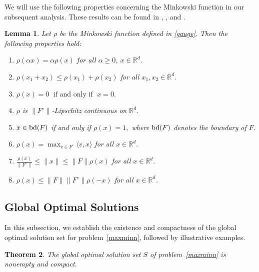 \documentclass[11pt]{article}
\newtheorem{theorem}{Theorem}[section]
\newtheorem{lemma}[theorem]{Lemma}
\theoremstyle{definition}
\newcommand{\R}{\mathbb{R}}
\newcommand{\1}{\mathbf{1}}
\begin{document}
We will use the following properties concerning the Minkowski function in our subsequent analysis. These results can be found in \cite[Proposition 2.1]{colombo2004subgradient},  \cite[Lemma 4.1]{longoptimletter}, and \cite[Theorem 6.14 and Proposition 6.18]{mordukhovich2023easy}.

\begin{lemma}\label{lemmarho0}
Let $\rho$ be the Minkowski function defined in \eqref{gauge}. Then the following properties hold:
	\begin{enumerate}
	\item [{\rm (a)}] $\rho(\alpha x) =\alpha\rho(x)$ for all $\alpha \geq0$,  $x\in \R^d$.
	\item [{\rm (b)}] $\rho(x_1+x_2)\leq \rho(x_1)+\rho(x_2)$ for all $x_1,x_2\in \R^d$.
	\item [{\rm (c)}] $\rho(x)=0\;\text{ if and only if }\; x=0.$
	\item [{\rm (d)}]  $\rho$ is $\|F^\circ\|$-Lipschitz continuous on $\R^d$.
	\item [{\rm (e)}] $x\in {\rm bd}(F)$ if and only if $\rho(x)=1,$ where ${\rm bd}(F)$ denotes the boundary of $F$.
	\item [{\rm (f)}] $\rho(x)=\max_{v\in F^\circ}\langle v,x\rangle$ for all $x\in \R^d.$
	\item [{\rm (g)}] $\frac{\rho(x)}{\|F^\circ\|}\leq \|x\|\leq \|F\|\rho(x)$ for all $x\in\R^d.$
\item [{\rm (h)}] $\rho (x)\leq \|F\|\|F^{\circ}\|\rho(-x)$ for all $x\in \R^d$.
	\end{enumerate}
\end{lemma}

\subsection{Global Optimal Solutions}
In this subsection, we establish the existence and compactness of the global optimal solution set for problem~\eqref{maxminn}, followed by illustrative examples.

\begin{theorem}\label{thm1}
The global optimal solution set $S$ of problem~\eqref{maxminn} is nonempty and compact.
\end{theorem}
\end{document}
